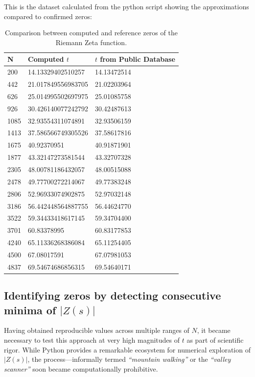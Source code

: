\documentclass[11pt,a4paper]{article}
\begin{document}
This is the dataset calculated from the python script showing the approximations compared to confirmed zeros:

\begin{table}[H]
\centering
\caption{Comparison between computed and reference zeros of the Riemann Zeta function.}
\begin{tabular}{lll}
\toprule
\textbf{N} & \textbf{Computed $t$} & \textbf{$t$ from Public Database} \\
\midrule
200  & 14.13329402510257  & 14.13472514 \\
442  & 21.017849556983705 & 21.02203964 \\
626  & 25.014995502697975 & 25.01085758 \\
926  & 30.426140077242792 & 30.42487613 \\
1085 & 32.93554311074891  & 32.93506159 \\
1413 & 37.586566749305526 & 37.58617816 \\
1675 & 40.92370951        & 40.91871901 \\
1877 & 43.32147273581544  & 43.32707328 \\
2305 & 48.00781186432057  & 48.00515088 \\
2478 & 49.77700272214067  & 49.77383248 \\
2806 & 52.96933074902875  & 52.97032148 \\
3186 & 56.442448564887755 & 56.44624770 \\
3522 & 59.34433418617145  & 59.34704400 \\
3701 & 60.83378995        & 60.83177853 \\
4240 & 65.11336268386084  & 65.11254405 \\
4500 & 67.08017591        & 67.07981053 \\
4837 & 69.54674686856315  & 69.54640171 \\
\bottomrule
\end{tabular}
\label{tab:computed_vs_public}
\end{table}

\newpage
\subsection{Identifying zeros by detecting consecutive minima of $|Z(s)|$}

Having obtained reproducible values across multiple ranges of \( N \), it became necessary to test this approach at very high magnitudes of \( t \) as part of scientific rigor.  
While Python provides a remarkable ecosystem for numerical exploration of \( |Z(s)| \), the process—informally termed \textit{“mountain walking”} or the \textit{“valley scanner”}
soon became computationally prohibitive.  
\end{document}
